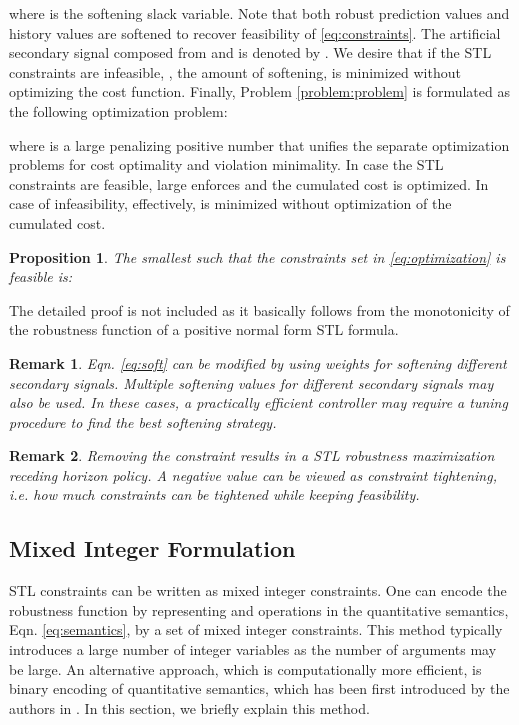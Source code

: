 \documentclass[letterpaper, 10 pt, conference]{ieeeconf}
\newtheorem{remark}{Remark}
\newtheorem{proposition}{Proposition}
\begin{document}
where  is the softening slack variable. Note that both robust prediction values and history values are softened to recover feasibility of \eqref{eq:constraints}. The artificial secondary signal composed from  and  is denoted by . 
We desire that if the STL constraints are infeasible, , the amount of softening, is minimized without optimizing the cost function. Finally, Problem \ref{problem:problem} is formulated as the following optimization problem:

where  is a large penalizing positive number that unifies the separate optimization problems for cost optimality and violation minimality. In case the STL constraints are feasible, large  enforces  and the cumulated cost is optimized. In case of infeasibility, effectively,  is minimized without optimization of the cumulated cost.


\begin{proposition}
The smallest  such that the constraints set in \eqref{eq:optimization} is feasible is:

\end{proposition}
The detailed proof is not included as it basically follows from the monotonicity of the robustness function of a positive normal form STL formula. 


\begin{remark}
Eqn. \eqref{eq:soft} can be modified by using weights for softening different secondary signals. Multiple softening values for different secondary signals may also be used. In these cases, a practically efficient controller may require a tuning procedure to find the best softening strategy. 
\end{remark}

\begin{remark}
Removing the constraint  results in a STL robustness maximization receding horizon policy. A negative  value can be viewed as \emph{constraint tightening}, i.e. how much constraints can be tightened while keeping feasibility. 
\end{remark}





\subsection{Mixed Integer Formulation}
STL constraints can be written as mixed integer constraints. One can encode the robustness function by representing  and  operations in the quantitative semantics, Eqn. \eqref{eq:semantics}, by a set of mixed integer constraints. This method typically introduces a large number of integer variables as the number of  arguments may be large. An alternative approach, which is computationally more efficient, is binary encoding of quantitative semantics, which has been first introduced by the authors in \cite{raman}. In this section, we briefly explain this method.
\end{document}

